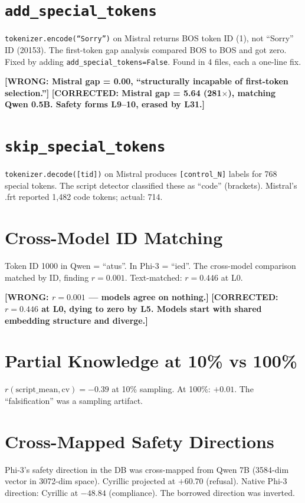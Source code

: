 \documentclass[11pt,a4paper]{report}
\newcommand{\wrong}[1]{\textcolor{wrong}{\textbf{[WRONG: #1]}}}
\newcommand{\corrected}[1]{\textcolor{corrected}{\textbf{[CORRECTED: #1]}}}
\begin{document}
\section{\texttt{add\_special\_tokens}}

\texttt{tokenizer.encode(``Sorry'')} on Mistral returns BOS token ID (1), not ``Sorry'' ID (20153). The first-token gap analysis compared BOS to BOS and got zero. Fixed by adding \texttt{add\_special\_tokens=False}. Found in 4 files, each a one-line fix.

\wrong{Mistral gap = 0.00, ``structurally incapable of first-token selection.''}
\corrected{Mistral gap = 5.64 (281$\times$), matching Qwen 0.5B. Safety forms L9--10, erased by L31.}

\section{\texttt{skip\_special\_tokens}}

\texttt{tokenizer.decode([tid])} on Mistral produces \texttt{[control\_N]} labels for 768 special tokens. The script detector classified these as ``code'' (brackets). Mistral's .frt reported 1,482 code tokens; actual: 714.

\section{Cross-Model ID Matching}

Token ID 1000 in Qwen = ``atus''. In Phi-3 = ``ied''. The cross-model comparison matched by ID, finding $r = 0.001$. Text-matched: $r = 0.446$ at L0.

\wrong{$r = 0.001$ --- models agree on nothing.}
\corrected{$r = 0.446$ at L0, dying to zero by L5. Models start with shared embedding structure and diverge.}

\section{Partial Knowledge at 10\% vs 100\%}

$r(\text{script\_mean}, \text{cv}) = -0.39$ at 10\% sampling. At 100\%: $+0.01$. The ``falsification'' was a sampling artifact.

\section{Cross-Mapped Safety Directions}

Phi-3's safety direction in the DB was cross-mapped from Qwen 7B (3584-dim vector in 3072-dim space). Cyrillic projected at $+60.70$ (refusal). Native Phi-3 direction: Cyrillic at $-48.84$ (compliance). The borrowed direction was inverted.
\end{document}
